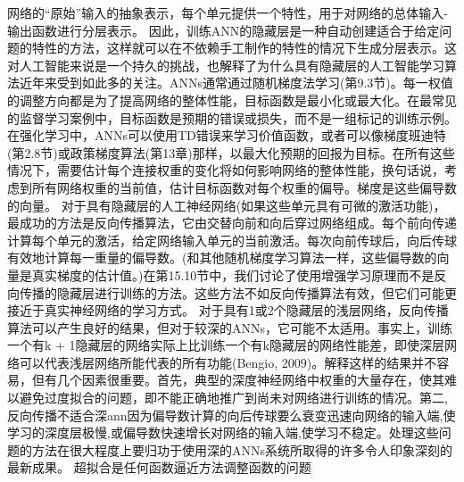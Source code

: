{网络的“原始”输入的抽象表示，每个单元提供一个特性，用于对网络的总体输入-输出函数进行分层表示。
因此，训练ANN的隐藏层是一种自动创建适合于给定问题的特性的方法，这样就可以在不依赖手工制作的特性的情况下生成分层表示。这对人工智能来说是一个持久的挑战，也解释了为什么具有隐藏层的人工智能学习算法近年来受到如此多的关注。ANNs通常通过随机梯度法学习(第9.3节)。每一权值的调整方向都是为了提高网络的整体性能，目标函数是最小化或最大化。在最常见的监督学习案例中，目标函数是预期的错误或损失，而不是一组标记的训练示例。在强化学习中，ANNs可以使用TD错误来学习价值函数，或者可以像梯度班迪特(第2.8节)或政策梯度算法(第13章)那样，以最大化预期的回报为目标。在所有这些情况下，需要估计每个连接权重的变化将如何影响网络的整体性能，换句话说，考虑到所有网络权重的当前值，估计目标函数对每个权重的偏导。梯度是这些偏导数的向量。
对于具有隐藏层的人工神经网络(如果这些单元具有可微的激活功能)，最成功的方法是反向传播算法，它由交替向前和向后穿过网络组成。每个前向传递计算每个单元的激活，给定网络输入单元的当前激活。每次向前传球后，向后传球有效地计算每一重量的偏导数。(和其他随机梯度学习算法一样，这些偏导数的向量是真实梯度的估计值。)在第15.10节中，我们讨论了使用增强学习原理而不是反向传播的隐藏层进行训练的方法。这些方法不如反向传播算法有效，但它们可能更接近于真实神经网络的学习方式。
对于具有1或2个隐藏层的浅层网络，反向传播算法可以产生良好的结果，但对于较深的ANNs，它可能不太适用。事实上，训练一个有k + 1隐藏层的网络实际上比训练一个有k隐藏层的网络性能差，即使深层网络可以代表浅层网络所能代表的所有功能(Bengio, 2009)。解释这样的结果并不容易，但有几个因素很重要。首先，典型的深度神经网络中权重的大量存在，使其难以避免过度拟合的问题，即不能正确地推广到尚未对网络进行训练的情况。第二,反向传播不适合深ann因为偏导数计算的向后传球要么衰变迅速向网络的输入端,使学习的深度层极慢,或偏导数快速增长对网络的输入端,使学习不稳定。处理这些问题的方法在很大程度上要归功于使用深的ANNs系统所取得的许多令人印象深刻的最新成果。
超拟合是任何函数逼近方法调整函数的问题

}
